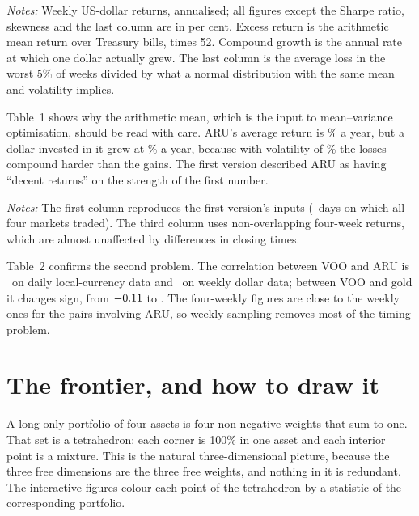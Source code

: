 \documentclass[11pt,a4paper]{article}
\newcommand{\tabnote}[1]{\par\vspace{5pt}\begin{minipage}{\linewidth}\setstretch{1.0}\footnotesize\textit{Notes:} #1\end{minipage}}
\begin{document}
\begin{table}[ht]
\centering\small
\caption{The four assets, 31 July 2015 to 25 July 2025}

\tabnote{Weekly US-dollar returns, annualised; all figures except the Sharpe ratio, skewness and the last column are in per cent. Excess return is the arithmetic mean return over Treasury bills, times 52. Compound growth is the annual rate at which one dollar actually grew. The last column is the average loss in the worst 5\% of weeks divided by what a normal distribution with the same mean and volatility implies.}
\end{table}

Table~1 shows why the arithmetic mean, which is the input to mean--variance optimisation, should be read with care. ARU's average return is \aruMeanTotal\% a year, but a dollar invested in it grew at \aruCagr\% a year, because with volatility of \aruVol\% the losses compound harder than the gains. The first version described ARU as having ``decent returns'' on the strength of the first number.

\begin{table}[ht]
\centering\small
\caption{Correlations under three ways of measuring returns}

\tabnote{The first column reproduces the first version's inputs (\nDailyObs\ days on which all four markets traded). The third column uses non-overlapping four-week returns, which are almost unaffected by differences in closing times.}
\end{table}

Table~2 confirms the second problem. The correlation between VOO and ARU is \corrVooAruDaily\ on daily local-currency data and \corrVooAruWeekly\ on weekly dollar data; between VOO and gold it changes sign, from $-0.11$ to \corrVooSglnWeekly. The four-weekly figures are close to the weekly ones for the pairs involving ARU, so weekly sampling removes most of the timing problem.

\section{The frontier, and how to draw it}

A long-only portfolio of four assets is four non-negative weights that sum to one. That set is a tetrahedron: each corner is 100\% in one asset and each interior point is a mixture. This is the natural three-dimensional picture, because the three free dimensions are the three free weights, and nothing in it is redundant. The interactive figures colour each point of the tetrahedron by a statistic of the corresponding portfolio.
\end{document}
